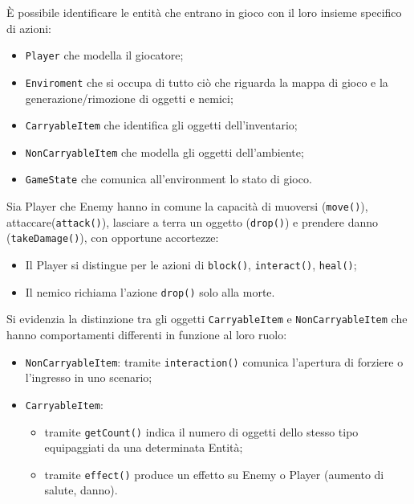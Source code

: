 \documentclass[a4paper, italian, 11pt, oneside]{report}
\begin{document}
È possibile identificare le entità che entrano in gioco con il loro insieme specifico di azioni:
\begin{itemize}
  \item \texttt{Player} che modella il giocatore;
  \item \texttt{Enviroment} che si occupa di tutto ciò che riguarda la mappa di gioco e la generazione/rimozione di oggetti e nemici;
  \item \texttt{CarryableItem} che identifica gli oggetti dell'inventario;
  \item \texttt{NonCarryableItem} che modella gli oggetti dell'ambiente;
  \item \texttt{GameState} che comunica all'environment lo stato di gioco.
\end{itemize}

Sia Player che Enemy hanno in comune la capacità di muoversi (\texttt{move()}), attaccare(\texttt{attack()}), lasciare a terra un oggetto (\texttt{drop()}) e prendere danno (\texttt{takeDamage()}), con opportune accortezze:
\begin{itemize}
  \item Il Player si distingue per le azioni di \texttt{block()}, \texttt{interact()}, \texttt{heal()};
  \item Il nemico richiama l'azione \texttt{drop()} solo alla morte.
\end{itemize}
Si evidenzia la distinzione tra gli oggetti \texttt{CarryableItem} e \texttt{NonCarryableItem} che hanno comportamenti differenti in funzione al loro ruolo:
\begin{itemize}
  \item \texttt{NonCarryableItem}: tramite \texttt{interaction()} comunica l'apertura di forziere o l'ingresso in uno scenario;
  \item \texttt{CarryableItem}: 
  \begin{itemize}
    \item tramite \texttt{getCount()} indica il numero di oggetti dello stesso tipo equipaggiati da una determinata Entità;
    \item tramite \texttt{effect()} produce un effetto su Enemy o Player (aumento di salute, danno).
  \end{itemize}
\end{itemize}

\end{document}
